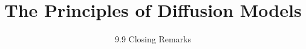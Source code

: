 
\title{The Principles of Diffusion Models}
\subtitle{9.9 Closing Remarks}


\begin{frame}
    \titlepage
\end{frame}


